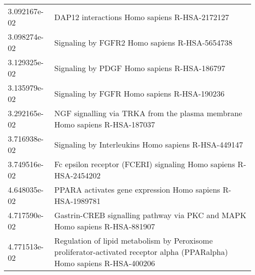 \begin{longtable}{p{2.4cm}p{14.5cm}}
             3.092167e-02 &                                                                             DAP12 interactions Homo sapiens R-HSA-2172127 \\
             3.098274e-02 &                                                                             Signaling by FGFR2 Homo sapiens R-HSA-5654738 \\
             3.129325e-02 &                                                                               Signaling by PDGF Homo sapiens R-HSA-186797 \\
             3.135979e-02 &                                                                               Signaling by FGFR Homo sapiens R-HSA-190236 \\
             3.292165e-02 &                                                NGF signalling via TRKA from the plasma membrane Homo sapiens R-HSA-187037 \\
             3.716938e-02 &                                                                       Signaling by Interleukins Homo sapiens R-HSA-449147 \\
             3.749516e-02 &                                                          Fc epsilon receptor (FCERI) signaling Homo sapiens R-HSA-2454202 \\
             4.648035e-02 &                                                                PPARA activates gene expression Homo sapiens R-HSA-1989781 \\
             4.717590e-02 &                                                Gastrin-CREB signalling pathway via PKC and MAPK Homo sapiens R-HSA-881907 \\
             4.771513e-02 &  Regulation of lipid metabolism by Peroxisome proliferator-activated receptor alpha (PPARalpha) Homo sapiens R-HSA-400206 \\
\end{longtable}


